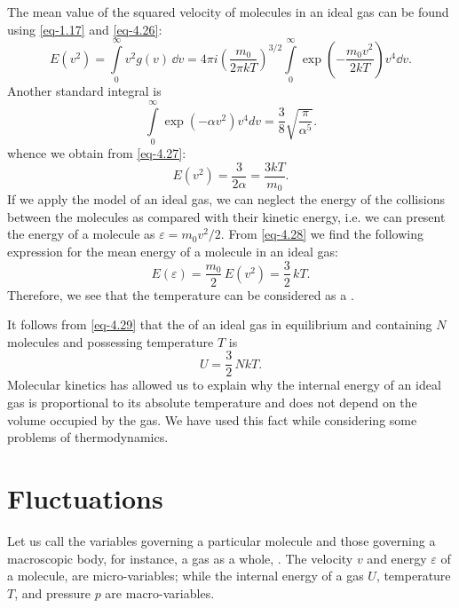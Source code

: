  The mean value of the squared velocity of molecules in an ideal gas can be found using \eqref{eq-1.17} and \eqref{eq-4.26}:
\begin{equation}%
E(v^{2})  = \int\limits_{0}^{\infty}  v^{2}  g(v) \, \dd v = 4 \pi  i \left( \frac{m_{0}}{2 \pi k T} \right) ^{3/2} \int\limits_{0}^{\infty}  \exp \left(- \frac{m_{0} v^{2}}{2 kT} \right)  v^{4} \dd v.
\label{eq-4.27}
\end{equation}
Another standard integral is
\begin{equation*}%
\int\limits_{0}^{\infty}  \exp \left(- \alpha v^{2} \right)  v^{4} dv = \frac{3}{8} \sqrt{\frac{\pi}{ \alpha^{5}}}.
\end{equation*}
whence we obtain from \eqref{eq-4.27}:
\begin{equation}%
E(v^{2})  = \frac{3}{2 \alpha} = \frac{3kT}{m_{0}}.
\label{eq-4.28}
\end{equation}
If we apply the model of an ideal gas, we can neglect the energy of the collisions between the molecules as compared with their kinetic energy, i.e. we can present the energy of a molecule as $\varepsilon = m_{0} v^{2}/2$. From \eqref{eq-4.28} we find the following expression for the mean energy of a molecule in an ideal gas:
\begin{equation}%
E(\varepsilon)  = \frac{m_{0}}{2}\, E (v^{2}) = \frac{3}{2}\, kT.
\label{eq-4.29}
\end{equation}
Therefore, we see that the temperature can be considered as a .

It follows from \eqref{eq-4.29} that the  of an ideal gas in equilibrium and containing $N$ molecules and possessing temperature $T$ is
\begin{equation}%
U = \frac{3}{2}\,NkT.
\label{energy-gas3}
\end{equation}
Molecular kinetics has allowed us to explain why the internal energy of an ideal gas is proportional to its absolute temperature and does not depend on the volume occupied by the gas. We have used this fact while considering some problems of thermodynamics.


\section{Fluctuations }

 Let us call the variables governing a particular molecule  and those governing a macroscopic body, for instance, a gas as a whole, . The velocity $v$ and energy $\varepsilon$ of a molecule, are micro-variables; while the internal energy of a gas $U$, temperature $T$, and pressure $p$ are macro-variables.

